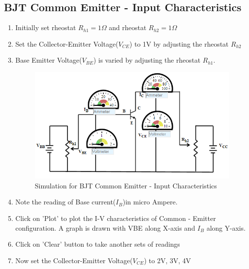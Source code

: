 		\subsection{BJT Common Emitter - Input Characteristics}
			\begin{enumerate}
				\tightlist
				\item Initially set rheostat $R_{h1} = 1\Omega$ and rheostat $R_{h2} = 1\Omega$
				\item Set the Collector-Emitter Voltage($V_{CE}$) to 1V by adjusting the rheostat $R_{h2}$
				\item Base Emitter Voltage($V_{BE}$) is varied by adjusting the rheostat $R_{h1}$.
				\begin{figure}[h]
					\centering
					\includegraphics[width=0.7\linewidth]{img/exp9/6}
					\caption{Simulation for BJT Common Emitter - Input Characteristics}
					\label{fig:bjt_procedure_input}
				\end{figure}
				\item Note the reading of Base current($I_B$)in micro Ampere.
				\item Click on 'Plot' to plot the I-V characteristics of Common - Emitter configuration. A graph is drawn with VBE along X-axis and $I_B$ along Y-axis.
				\item Click on 'Clear' button to take another sets of readings
				\item Now set the Collector-Emitter Voltage($V_{CE}$) to 2V, 3V, 4V
			\end{enumerate}
		
